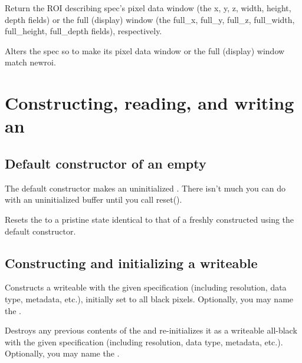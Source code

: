 Return the ROI describing {\cf spec}'s pixel data window (the {\cf x, y, z,
width, height, depth} fields)
or the full (display) window (the {\cf full_x, full_y, full_z,
full_width, full_height, full_depth} fields), respectively.
\apiend

Alters the {\cf spec} so to make its pixel data window 
or the full (display) window match {\cf newroi}.
\apiend



\section{Constructing, reading, and writing an \ImageBuf}

\subsection*{Default constructor of an empty \ImageBuf}

The default constructor makes an uninitialized \ImageBuf.  There isn't
much you can do with an uninitialized buffer until you call {\cf reset()}.
\apiend

Resets the \ImageBuf to a pristine state identical to that of a freshly
constructed \ImageBuf using the default constructor.
\apiend


\subsection*{Constructing and initializing a writeable \ImageBuf}

Constructs a writeable \ImageBuf with the given specification (including
resolution, data type, metadata, etc.), initially set to all black pixels.
Optionally, you may name the \ImageBuf.
\apiend

Destroys any previous contents of the \ImageBuf and re-initializes it
as a writeable all-black \ImageBuf with the given specification (including
resolution, data type, metadata, etc.).  Optionally, you may name the
\ImageBuf.
\apiend

